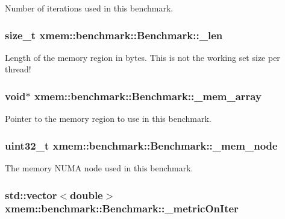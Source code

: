 Number of iterations used in this benchmark. \hypertarget{classxmem_1_1benchmark_1_1_benchmark_ae97857f36cabdbe76eb00142835f7881}{
\subsubsection[{\-\_\-len}]{\setlength{\rightskip}{0pt plus 5cm}size\-\_\-t xmem\-::benchmark\-::\-Benchmark\-::\-\_\-len\hspace{0.3cm}{\ttfamily [protected]}}}\label{classxmem_1_1benchmark_1_1_benchmark_ae97857f36cabdbe76eb00142835f7881}
Length of the memory region in bytes. This is not the working set size per thread! \hypertarget{classxmem_1_1benchmark_1_1_benchmark_a134705051be06902b276f5c21d435ed0}{
\subsubsection[{\-\_\-mem\-\_\-array}]{\setlength{\rightskip}{0pt plus 5cm}void$\ast$ xmem\-::benchmark\-::\-Benchmark\-::\-\_\-mem\-\_\-array\hspace{0.3cm}{\ttfamily [protected]}}}\label{classxmem_1_1benchmark_1_1_benchmark_a134705051be06902b276f5c21d435ed0}
Pointer to the memory region to use in this benchmark. \hypertarget{classxmem_1_1benchmark_1_1_benchmark_a8489553bc6539a9b19db72e9f6ca9a9e}{
\subsubsection[{\-\_\-mem\-\_\-node}]{\setlength{\rightskip}{0pt plus 5cm}uint32\-\_\-t xmem\-::benchmark\-::\-Benchmark\-::\-\_\-mem\-\_\-node\hspace{0.3cm}{\ttfamily [protected]}}}\label{classxmem_1_1benchmark_1_1_benchmark_a8489553bc6539a9b19db72e9f6ca9a9e}
The memory N\-U\-M\-A node used in this benchmark. \hypertarget{classxmem_1_1benchmark_1_1_benchmark_a1c3ef60ba77f151cc4d5b4b77d2deefa}{
\subsubsection[{\-\_\-metric\-On\-Iter}]{\setlength{\rightskip}{0pt plus 5cm}std\-::vector$<$double$>$ xmem\-::benchmark\-::\-Benchmark\-::\-\_\-metric\-On\-Iter\hspace{0.3cm}{\ttfamily [protected]}}}\label{classxmem_1_1benchmark_1_1_benchmark_a1c3ef60ba77f151cc4d5b4b77d2deefa}
